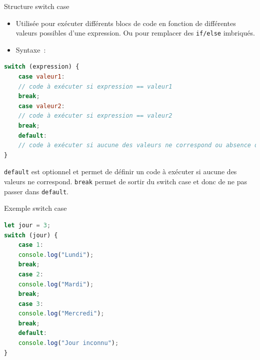 \documentclass{beamer}
\begin{document}
    \begin{frame}[fragile]{Structure switch case}
        \begin{itemize}
            \item Utilisée pour exécuter différents blocs de code en fonction de différentes
            valeurs possibles d'une expression.
            Ou pour remplacer des \lstinline{if/else} imbriqués.
            \item Syntaxe~:
        \end{itemize}
        \begin{lstlisting}[language=JavaScript,title={\scriptsize{Script JavaScript}}]
switch (expression) {
    case valeur1:
    // code à exécuter si expression == valeur1
    break;
    case valeur2:
    // code à exécuter si expression == valeur2
    break;
    default:
    // code à exécuter si aucune des valeurs ne correspond ou absence de break
}
        \end{lstlisting}
        \lstinline{default} est optionnel et permet de définir un code à exécuter si aucune des valeurs ne correspond.
        \lstinline{break} permet de sortir du switch case et donc de ne pas passer dans \lstinline{default}.
    \end{frame}

    \begin{frame}[fragile]{Exemple switch case}
        \begin{lstlisting}[language=JavaScript,title={\scriptsize{Script JavaScript}}]
let jour = 3;
switch (jour) {
    case 1:
    console.log("Lundi");
    break;
    case 2:
    console.log("Mardi");
    break;
    case 3:
    console.log("Mercredi");
    break;
    default:
    console.log("Jour inconnu");
}
        \end{lstlisting}
    \end{frame}
\end{document}
